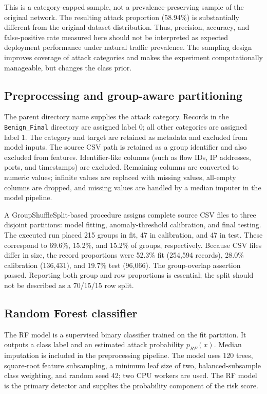 \documentclass[runningheads]{llncs}
\begin{document}
This is a category-capped sample, not a prevalence-preserving sample of the original network. The resulting attack proportion (58.94\%) is substantially different from the original dataset distribution. Thus, precision, accuracy, and false-positive rate measured here should not be interpreted as expected deployment performance under natural traffic prevalence. The sampling design improves coverage of attack categories and makes the experiment computationally manageable, but changes the class prior.

\subsection{Preprocessing and group-aware partitioning}
The parent directory name supplies the attack category. Records in the \texttt{Benign\_Final} directory are assigned label 0; all other categories are assigned label 1. The category and target are retained as metadata and excluded from model inputs. The source CSV path is retained as a group identifier and also excluded from features. Identifier-like columns (such as flow IDs, IP addresses, ports, and timestamps) are excluded. Remaining columns are converted to numeric values; infinite values are replaced with missing values, all-empty columns are dropped, and missing values are handled by a median imputer in the model pipeline.

A GroupShuffleSplit-based procedure assigns complete source CSV files to three disjoint partitions: model fitting, anomaly-threshold calibration, and final testing. The executed run placed 215 groups in fit, 47 in calibration, and 47 in test. These correspond to 69.6\%, 15.2\%, and 15.2\% of groups, respectively. Because CSV files differ in size, the record proportions were 52.3\% fit (254,594 records), 28.0\% calibration (136,431), and 19.7\% test (96,066). The group-overlap assertion passed. Reporting both group and row proportions is essential; the split should not be described as a 70/15/15 row split.

\subsection{Random Forest classifier}
The RF model is a supervised binary classifier trained on the fit partition. It outputs a class label and an estimated attack probability $p_{RF}(x)$. Median imputation is included in the preprocessing pipeline. The model uses 120 trees, square-root feature subsampling, a minimum leaf size of two, balanced-subsample class weighting, and random seed 42; two CPU workers are used. The RF model is the primary detector and supplies the probability component of the risk score.
\end{document}
